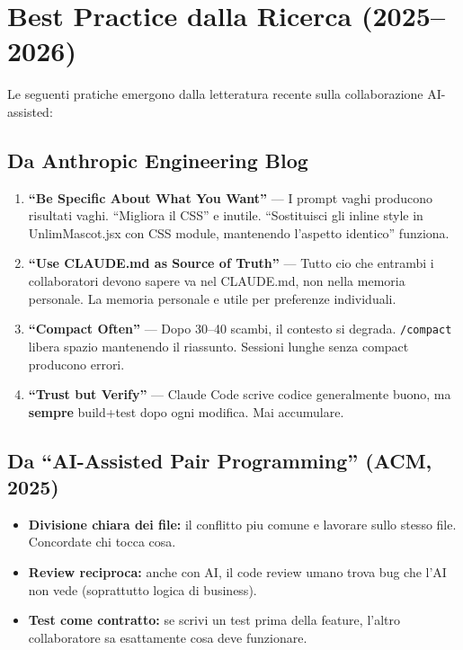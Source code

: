 \documentclass[11pt,a4paper]{article}
\begin{document}
\section{Best Practice dalla Ricerca (2025--2026)}

Le seguenti pratiche emergono dalla letteratura recente sulla collaborazione AI-assisted:

\subsection{Da Anthropic Engineering Blog}

\begin{enumerate}[leftmargin=2em]
  \item \textbf{``Be Specific About What You Want''} --- I prompt vaghi producono risultati vaghi. ``Migliora il CSS'' e inutile. ``Sostituisci gli inline style in UnlimMascot.jsx con CSS module, mantenendo l'aspetto identico'' funziona.

  \item \textbf{``Use CLAUDE.md as Source of Truth''} --- Tutto cio che entrambi i collaboratori devono sapere va nel CLAUDE.md, non nella memoria personale. La memoria personale e utile per preferenze individuali.

  \item \textbf{``Compact Often''} --- Dopo 30--40 scambi, il contesto si degrada. \texttt{/compact} libera spazio mantenendo il riassunto. Sessioni lunghe senza compact producono errori.

  \item \textbf{``Trust but Verify''} --- Claude Code scrive codice generalmente buono, ma \textbf{sempre} build+test dopo ogni modifica. Mai accumulare.
\end{enumerate}

\subsection{Da ``AI-Assisted Pair Programming'' (ACM, 2025)}

\begin{itemize}[leftmargin=2em]
  \item \textbf{Divisione chiara dei file:} il conflitto piu comune e lavorare sullo stesso file. Concordate chi tocca cosa.
  \item \textbf{Review reciproca:} anche con AI, il code review umano trova bug che l'AI non vede (soprattutto logica di business).
  \item \textbf{Test come contratto:} se scrivi un test prima della feature, l'altro collaboratore sa esattamente cosa deve funzionare.
\end{itemize}
\end{document}

